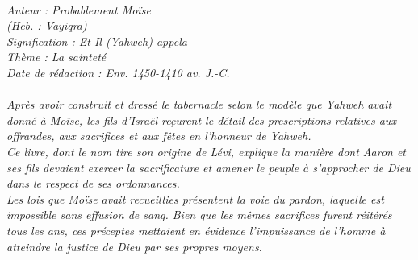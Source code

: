 \BFont
\noindent\hrulefill
{\footnotesize
\textit{
\bigskip
{\centering{}
\\Auteur : Probablement Moïse
\\(Heb. : Vayiqra)
\\Signification : Et Il (Yahweh) appela 
\\Thème : La sainteté
\\Date de rédaction : Env. 1450-1410 av. J.-C.\\}
}
\textit{
\\Après avoir construit et dressé le tabernacle selon le modèle que Yahweh avait donné à Moïse, les fils d'Israël reçurent le détail des prescriptions relatives aux offrandes, aux sacrifices et aux fêtes en l'honneur de Yahweh. 
\\Ce livre, dont le nom tire son origine de Lévi, explique la manière dont Aaron et ses fils devaient exercer la sacrificature et amener le peuple à s'approcher de Dieu dans le respect de ses ordonnances.
\\Les lois que Moïse avait recueillies présentent la voie du pardon, laquelle est impossible sans effusion de sang. Bien que les mêmes sacrifices furent réitérés tous les ans, ces préceptes mettaient en évidence l'impuissance de l'homme à atteindre la justice de Dieu par ses propres moyens.\bigskip
}
}
\par\nobreak\noindent\hrulefill
